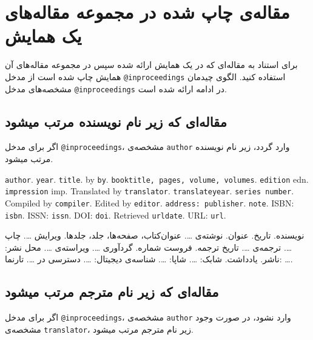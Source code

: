 \documentclass[a4paper,11pt]{article}
\begin{document}
\section{مقاله‌ی چاپ شده در مجموعه مقاله‌های یک همایش}
برای استناد به مقاله‌ای که در یک همایش ارائه شده سپس در مجموعه مقاله‌های آن همایش چاپ شده است از مدخل \verb|@inproceedings| استفاده کنید. الگوی چیدمان مشخصه‌های مدخل \verb|@inproceedings| در ادامه ارائه شده است.





\subsection{مقاله‌ای که زیر نام نویسنده مرتب میشود}
اگر برای مدخل \verb|@inproceedings|، مشخصه‌ی \verb|author| وارد گردد، زیر نام نویسنده مرتب میشود.

\begin{itemize}[nosep]
\begin{latin}
\item[] []
{\tt author}. {\tt year}. {\tt title}. by {\tt by}. {\tt booktitle, pages, volume, volumes}. {\tt edition} edn. {\tt impression} imp. Translated by {\tt translator}. {\tt translateyear}. {\tt series number}. Compiled by {\tt compiler}. Edited by {\tt editor}. {\tt address: publisher}. {\tt note}. ISBN: {\tt isbn}. ISSN: {\tt issn}. DOI: {\tt doi}. Retrieved {\tt urldate}. URL: {\tt url}. 
\end{latin}

\item[] []
{\persianttfamily نویسنده}. {\persianttfamily تاریخ}. {\persianttfamily عنوان}. نوشته‌ی {\persianttfamily …}. {\persianttfamily عنوان‌کتاب، صفحه‌ها، جلد، جلدها}. ویرایش {\persianttfamily …}. چاپ {\persianttfamily …}. ترجمه‌ی {\persianttfamily …}. {\persianttfamily تاریخ ترجمه}. {\persianttfamily فروست شماره}. گردآوری {\persianttfamily …}. ویراسته‌ی {\persianttfamily …}. {\persianttfamily محل نشر: ناشر}. {\persianttfamily یادداشت}. شابک: {\persianttfamily …}. شاپا: {\persianttfamily …}. شناسه‌ی دیجیتال: {\persianttfamily …}. دسترسی در {\persianttfamily …}. تارنما: {\persianttfamily …}. 
\end{itemize}





\subsection{مقاله‌ای که زیر نام مترجم مرتب میشود}
اگر برای مدخل \verb|@inproceedings|، مشخصه‌ی \verb|author| وارد نشود، در صورت وجود مشخصه‌ی \verb|translator|، زیر نام مترجم مرتب میشود.
\end{document}
